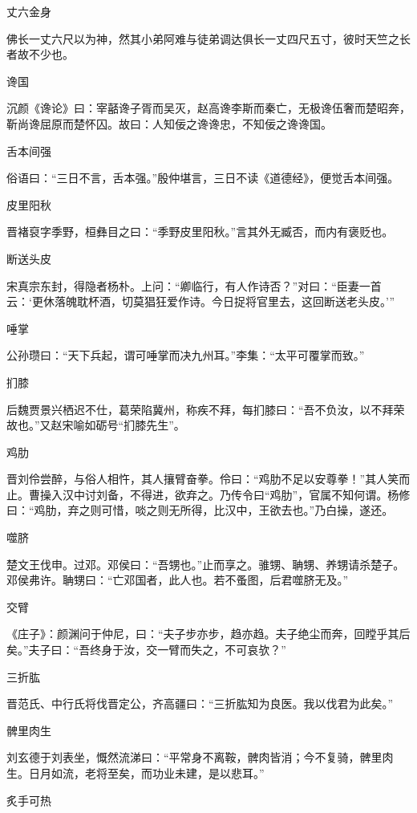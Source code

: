\documentclass[a4paper,12pt,UTF8,twoside]{ctexbook}
\begin{document}
    丈六金身
    
    佛长一丈六尺以为神，然其小弟阿难与徒弟调达俱长一丈四尺五寸，彼时天竺之长者故不少也。
    
    谗国
    
    沉颜《谗论》曰：宰嚭谗子胥而吴灭，赵高谗李斯而秦亡，无极谗伍奢而楚昭奔，靳尚谗屈原而楚怀囚。故曰：人知佞之谗谗忠，不知佞之谗谗国。
    
    舌本间强
    
    俗语曰：“三日不言，舌本强。”殷仲堪言，三日不读《道德经》，便觉舌本间强。
    
    皮里阳秋
    
    晋褚裒字季野，桓彝目之曰：“季野皮里阳秋。”言其外无臧否，而内有褒贬也。
    
    断送头皮
    
    宋真宗东封，得隐者杨朴。上问：“卿临行，有人作诗否？”对曰：“臣妻一首云：‘更休落魄耽杯酒，切莫猖狂爱作诗。今日捉将官里去，这回断送老头皮。’”
    
    唾掌
    
    公孙瓒曰：“天下兵起，谓可唾掌而决九州耳。”李集：“太平可覆掌而致。”
    
    扪膝
    
    后魏贾景兴栖迟不仕，葛荣陷冀州，称疾不拜，每扪膝曰：“吾不负汝，以不拜荣故也。”又赵宋喻如砺号“扪膝先生”。
    
    鸡肋
    
    晋刘伶尝醉，与俗人相忤，其人攘臂奋拳。伶曰：“鸡肋不足以安尊拳！”其人笑而止。曹操入汉中讨刘备，不得进，欲弃之。乃传令曰“鸡肋”，官属不知何谓。杨修曰：“鸡肋，弃之则可惜，啖之则无所得，比汉中，王欲去也。”乃白操，遂还。
    
    噬脐
    
    楚文王伐申。过邓。邓侯曰：“吾甥也。”止而享之。骓甥、聃甥、养甥请杀楚子。邓侯弗许。聃甥曰：“亡邓国者，此人也。若不蚤图，后君噬脐无及。”
    
    交臂
    
    《庄子》：颜渊问于仲尼，曰：“夫子步亦步，趋亦趋。夫子绝尘而奔，回瞠乎其后矣。”夫子曰：“吾终身于汝，交一臂而失之，不可哀欤？”
    
    三折肱
    
    晋范氏、中行氏将伐晋定公，齐高疆曰：“三折肱知为良医。我以伐君为此矣。”
    
    髀里肉生
    
    刘玄德于刘表坐，慨然流涕曰：“平常身不离鞍，髀肉皆消；今不复骑，髀里肉生。日月如流，老将至矣，而功业未建，是以悲耳。”
    
    炙手可热
    
\end{document}
